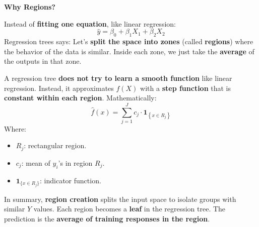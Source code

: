 \highspace
\begin{flushleft}
    \textcolor{Green3}{ \textbf{Why Regions?}}
\end{flushleft}
Instead of \textbf{fitting one equation}, like linear regression:
\begin{equation*}
    \hat{y} = \beta_0 + \beta_1 X_1 + \beta_2 X_2
\end{equation*}
Regression trees says: Let's \textbf{split the space into zones} (called \textbf{regions}) where the behavior of the data is similar. Inside each zone, we just take the \textbf{average} of the outputs in that zone.

\highspace
A regression tree \textbf{does not try to learn a smooth function} like linear regression. Instead, it approximates $f(X)$ with a \textbf{step function} that is \textbf{constant within each region}. Mathematically:
\begin{equation}
    \hat{f}(x) = \sum_{j=1}^J c_j \cdot \mathbf{1}_{\left\{x \in R_j\right\}}
\end{equation}
Where:
\begin{itemize}
    \item $R_j$: rectangular region.
    \item $c_j$: mean of $y_i$'s in region $R_j$.
    \item $\mathbf{1}_{\{x \in R_j\}}$: indicator function.
\end{itemize}

\highspace
In summary, \textbf{region creation} splits the input space to isolate groups with similar $Y$ values. Each region becomes a \textbf{leaf} in the regression tree. The prediction is the \textbf{average of training responses in the region}.